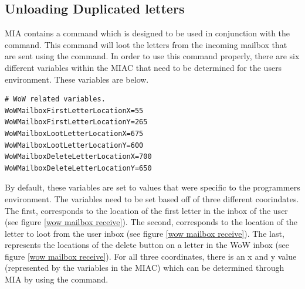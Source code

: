 \subsection{Unloading Duplicated letters}

MIA contains a command  which is designed to be used in conjunction with the  command. This command will loot the letters from the incoming mailbox that are sent using the  command. In order to use this command properly, there are six different variables within the MIAC that need to be determined for the users environment. These variables are below.

\begin{lstlisting}
# WoW related variables.
WoWMailboxFirstLetterLocationX=55
WoWMailboxFirstLetterLocationY=265
WoWMailboxLootLetterLocationX=675
WoWMailboxLootLetterLocationY=600
WoWMailboxDeleteLetterLocationX=700
WoWMailboxDeleteLetterLocationY=650
\end{lstlisting}

By default, these variables are set to values that were specific to the programmers environment. The variables need to be set based off of three different coorindates. The first,  corresponds to the location of the first letter in the inbox of the user (see figure \ref{wow mailbox receive}). The second,  corresponds to the location of the letter to loot from the user inbox (see figure \ref{wow mailbox receive}). The last,  represents the locations of the delete button on a letter in the WoW inbox (see figure \ref{wow mailbox receive}).  For all three coordinates, there is an x and y value (represented by the variables in the MIAC) which can be determined through MIA by using the  command.
